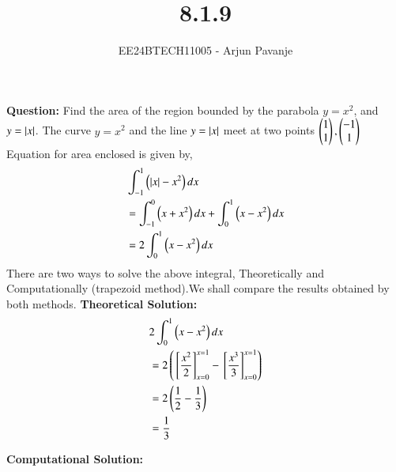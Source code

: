 \documentclass[journal]{IEEEtran}
\begin{document}

\vspace{3cm}

\title{8.1.9}
\author{EE24BTECH11005 - Arjun Pavanje}
{\let\newpage\relax\maketitle}
\textbf{Question:}
Find the area of the region bounded by the parabola $y=x^2$,  and $y=\left\vert x\right\vert$.
\solution\newline
The curve $y=x^2$ and the line $y=\left\vert x\right\vert$ meet at two points $\begin{pmatrix}1\\1\end{pmatrix}, \begin{pmatrix}-1\\1\end{pmatrix}$
Equation for area enclosed is given by,
\begin{align}
  &\int_{-1}^1\left(\left\vert x\right\vert-x^2\right)dx\\
  &=\int_{-1}^{0}\left(x+x^2\right)dx + \int_0^1\left(x-x^2\right)dx\\
  &=2\int_0^1\left(x-x^2\right)dx
\end{align}
There are two ways to solve the above integral, Theoretically and Computationally (trapezoid method).We shall compare the results obtained by both methods.\newline
\textbf{Theoretical Solution:}\newline
\begin{align}
  &2\int_0^1 \left(x-x^2\right)dx\\
  &=2\left({}\left[\frac{x^2}{2}\right]_{x=0}^{x=1} -{}\left[\frac{x^3}{3}\right]_{x=0}^{x=1}\right)\\
  &=2\left(\frac{1}{2}-\frac{1}{3}\right)\\
  &=\frac{1}{3}
\end{align}

\textbf{Computational Solution:}\newline
\end{document}
